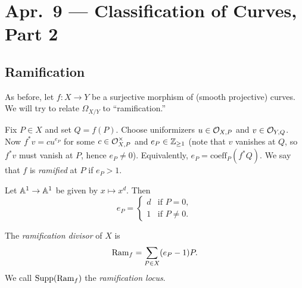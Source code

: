 \chapter{Apr.~9 --- Classification of Curves, Part 2}

\section{Ramification}

\begin{remark}
  As before, let $f : X \to Y$
  be a surjective morphism of
  (smooth projective) curves.
  We will try to relate $\Omega_{X / Y}$
  to ``ramification.''
\end{remark}

\begin{definition}
  Fix $P \in X$ and set $Q = f(P)$.
  Choose uniformizers $u \in \mathcal{O}_{X, P}$ and
  $v \in \mathcal{O}_{Y, Q}$. Now
  $f^* v = c u^{e_P}$ for some
  $c \in \mathcal{O}_{X, P}^\times$ and
  $e_P \in \mathbb{Z}_{\ge 1}$ (note that
  $v$ vanishes at $Q$, so $f^* v$ must vanish
  at $P$, hence $e_P \ne 0$). Equivalently,
  $e_P = \mathrm{coeff}_P(f^* Q)$. We say
  that $f$ is \emph{ramified} at $P$
  if $e_P > 1$.
\end{definition}

\begin{example}
  Let $\mathbb{A}^1 \to \mathbb{A}^1$ be given
  by $x \mapsto x^d$. Then
  \[
    e_P =
    \begin{cases}
      d & \text{if } P = 0, \\
      1 & \text{if } P \ne 0.
    \end{cases}
  \]
\end{example}

\begin{definition}
  The \emph{ramification divisor} of $X$ is
  \[
    \operatorname{Ram}_f
    = \sum_{P \in X} (e_P - 1) P.
  \]
  We call $\operatorname{Supp}(\operatorname{Ram}_f)$ the
  \emph{ramification locus}.
\end{definition}

